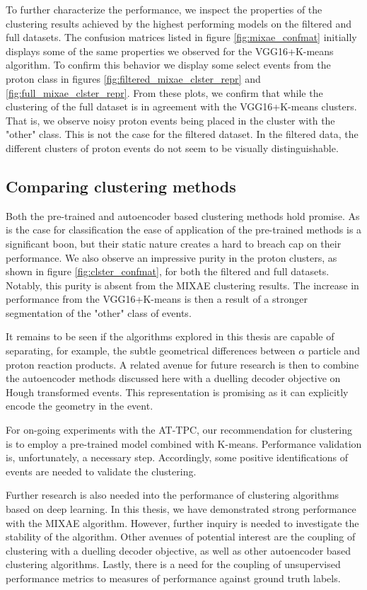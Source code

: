 To further characterize the performance, we inspect the properties of the clustering results achieved by the highest performing models on the filtered and full datasets. The confusion matrices listed in figure \ref{fig:mixae_confmat} initially displays some of the same properties we observed for the VGG16+K-means algorithm. To confirm this behavior we display some select events from the proton class in figures \ref{fig:filtered_mixae_clster_repr} and \ref{fig:full_mixae_clster_repr}. From these plots, we confirm that while the clustering of the full dataset is in agreement with the VGG16+K-means clusters. That is, we observe noisy proton events being placed in the cluster with the "other" class. This is not the case for the filtered dataset. In the filtered data, the different clusters of proton events do not seem to be visually distinguishable.

\subsection{Comparing clustering methods}

Both the pre-trained and autoencoder based clustering methods hold promise. As is the case for classification the ease of application of the pre-trained methods is a significant boon, but their static nature creates a hard to breach cap on their performance. We also observe an impressive purity in the proton clusters, as shown in figure \ref{fig:clster_confmat}, for both the filtered and full datasets. Notably, this purity is absent from the MIXAE clustering results. The increase in performance from the VGG16+K-means is then a result of a stronger segmentation of the "other" class of events.

It remains to be seen if the algorithms explored in this thesis are capable of separating, for example, the subtle geometrical differences between $\alpha$ particle and proton reaction products. A related avenue for future research is then to combine the autoencoder methods discussed here with a duelling decoder objective on Hough transformed events. This representation is promising as it can explicitly encode the geometry in the event.

For on-going experiments with the AT-TPC, our recommendation for clustering is to employ a pre-trained model combined with K-means. Performance validation is, unfortunately, a necessary step. Accordingly, some positive identifications of events are needed to validate the clustering. 

Further research is also needed into the performance of clustering algorithms based on deep learning. In this thesis, we have demonstrated strong performance with the MIXAE algorithm. However, further inquiry is needed to investigate the stability of the algorithm. Other avenues of potential interest are the coupling of clustering with a duelling decoder objective, as well as other autoencoder based clustering algorithms. Lastly, there is a need for the coupling of unsupervised performance metrics to measures of performance against ground truth labels.  